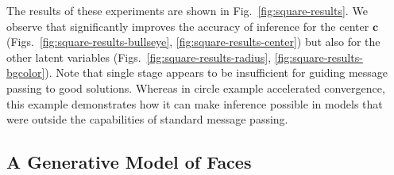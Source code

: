 The results of these experiments are shown in Fig.~\ref{fig:square-results}. We observe that \MTD significantly improves the accuracy of inference for the center $\mathbf{c}$ (Figs.~\ref{fig:square-results-bullseye}, \ref{fig:square-results-center}) but also for the other latent variables (Figs.~\ref{fig:square-results-radius}, \ref{fig:square-results-bgcolor}). Note that single stage \MTD appears to be insufficient for guiding message passing to good solutions. Whereas in circle example \MTD accelerated convergence, this example demonstrates how it can make inference possible in models that were outside the capabilities of standard message passing.

\subsection{A Generative Model of Faces}
\label{sec:shading}

